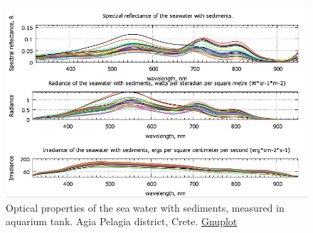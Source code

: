 \documentclass[10pt, a4paper]{article}
\begin{document}
\begin{figure}[h]
	\centering
	\includegraphics[scale=0.5]{GNU-17.jpg}
	\caption{Optical properties of the sea water with sediments, measured in aquarium tank. Agia Pelagia district, Crete. \href{http://www.gnuplot.info/}				{Gnuplot}}\label{fig:4.2}
\end{figure}
\pagebreak

%
\end{document}

